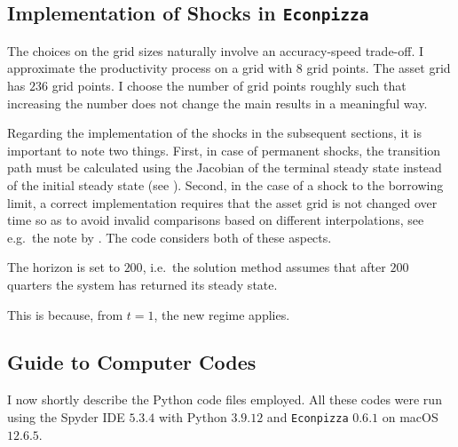 \documentclass[a4paper,12pt]{article} %
\numberwithin{equation}{section} %
\numberwithin{figure}{section}
\numberwithin{table}{section}
\begin{document}
\begin{refsection}
\begin{appendices}
\subsection{Implementation of Shocks in \texttt{Econpizza}}
\label{sec-app:codes-ep}

The choices on the grid sizes naturally involve an accuracy-speed trade-off. I approximate the productivity process on a grid with $8$ grid points. The asset grid has $236$ grid points. I choose the number of grid points roughly such that increasing the number does not change the main results in a meaningful way.

Regarding the implementation of the shocks in the subsequent sections, it is important to note two things. First, in case of permanent shocks, the transition path must be calculated using the Jacobian of the terminal steady state instead of the initial steady state (see \cite{auclert2021}). Second, in the case of a shock to the borrowing limit, a correct implementation requires that the asset grid is not changed over time so as to avoid invalid comparisons based on different interpolations, see e.g.~the note by \textcite{mellior2016mimeo}. The code considers both of these aspects.

The horizon is set to $200$, i.e.~the solution method assumes that after $200$ quarters the system has returned its steady state.


This is because, from $t=1$, the new regime applies.

\subsection{Guide to Computer Codes}
\label{sec-app:codes-guide}

I now shortly describe the Python code files employed. All these codes were run using the Spyder IDE $5.3.4$ with Python $3.9.12$ and \texttt{Econpizza} $0.6.1$ on macOS $12.6.5$.


\end{appendices}
\end{refsection}
\end{document}
